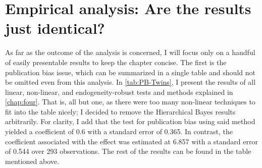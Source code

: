 \section{Empirical analysis: Are the results just identical?}
\label{sec:twins_analysis}

As far as the outcome of the analysis is concerned, I will focus only on a handful of easily presentable results to keep the chapter concise.  The first is the publication bias issue, which can be summarized in a single table and should not be omitted even from this analysis. In \autoref{tab:PB-Twins}, I present the results of all linear, non-linear, and endogeneity-robust tests and methods explained in \autoref{chap:four}. That is, all but one, as there were too many non-linear techniques to fit into the table nicely; I decided to remove the Hierarchical Bayes results arbitrarily. For clarity, I add that the test for publication bias using said method yielded a coefficient of 0.6 with a standard error of 0.365. In contrast, the coefficient associated with the effect was estimated at 6.857 with a standard error of 0.544 over 293 observations. The rest of the results can be found in the table mentioned above.

